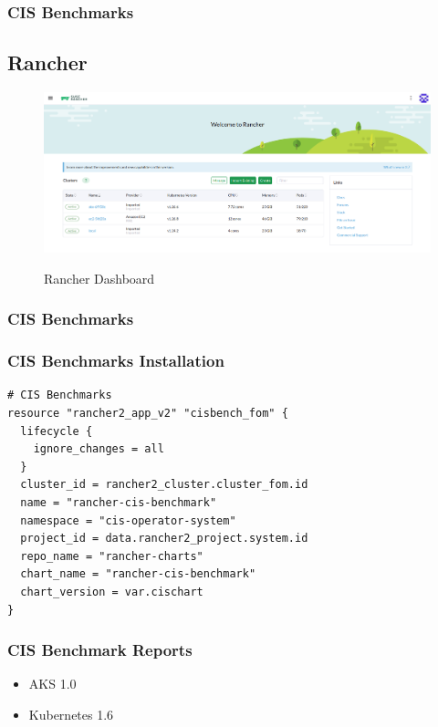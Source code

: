 \subsubsection{CIS Benchmarks}

\subsection{Rancher}

\begin{figure}[H]
\centering
\caption {Rancher Dashboard}
\includegraphics[width=\linewidth]{images/rancher-dashboard.png}
\label{fig:rancherDashboard}
\end{figure}

\subsubsection{CIS Benchmarks}

\subsubsection{CIS Benchmarks Installation}

\begin{lstlisting}[caption=Installing CIS Benchmarks, frame=single, basicstyle=\ttfamily]
# CIS Benchmarks
resource "rancher2_app_v2" "cisbench_fom" {
  lifecycle {
    ignore_changes = all
  }
  cluster_id = rancher2_cluster.cluster_fom.id
  name = "rancher-cis-benchmark"
  namespace = "cis-operator-system"
  project_id = data.rancher2_project.system.id
  repo_name = "rancher-charts"
  chart_name = "rancher-cis-benchmark"
  chart_version = var.cischart
}
\end{lstlisting}

\subsubsection{CIS Benchmark Reports}

\begin{itemize}
 \item AKS 1.0
 \item Kubernetes 1.6
\end{itemize}
